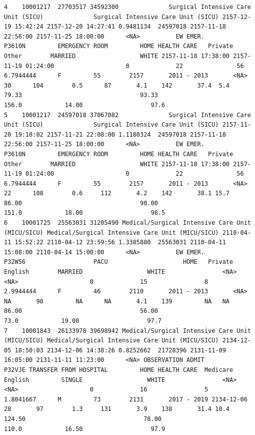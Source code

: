 \documentclass[
]{article}
\begin{document}
\begin{verbatim}
4    10001217  27703517 34592300              Surgical Intensive Care Unit (SICU)              Surgical Intensive Care Unit (SICU) 2157-12-19 15:42:24 2157-12-20 14:27:41 0.9481134  24597018 2157-11-18 22:56:00 2157-11-25 18:00:00      <NA>          EW EMER.            P3610N         EMERGENCY ROOM         HOME HEALTH CARE   Private    Other        MARRIED                  WHITE 2157-11-18 17:38:00 2157-11-19 01:24:00                    0             22               56      6.7944444      F         55        2157       2011 - 2013       <NA>          30      104        0.5      87       4.1    142       37.4  5.4      79.33                                 93.33                                156.0            14.00                   97.6
5    10001217  24597018 37067082              Surgical Intensive Care Unit (SICU)              Surgical Intensive Care Unit (SICU) 2157-11-20 19:18:02 2157-11-21 22:08:00 1.1180324  24597018 2157-11-18 22:56:00 2157-11-25 18:00:00      <NA>          EW EMER.            P3610N         EMERGENCY ROOM         HOME HEALTH CARE   Private    Other        MARRIED                  WHITE 2157-11-18 17:38:00 2157-11-19 01:24:00                    0             22               56      6.7944444      F         55        2157       2011 - 2013       <NA>          22      108        0.6     112       4.2    142       38.1 15.7      86.00                                 90.00                                151.0            18.00                   98.5
6    10001725  25563031 31205490 Medical/Surgical Intensive Care Unit (MICU/SICU) Medical/Surgical Intensive Care Unit (MICU/SICU) 2110-04-11 15:52:22 2110-04-12 23:59:56 1.3385880  25563031 2110-04-11 15:08:00 2110-04-14 15:00:00      <NA>          EW EMER.            P32W56                   PACU                     HOME   Private  English        MARRIED                  WHITE                <NA>                <NA>                    0             15                8      2.9944444      F         46        2110       2011 - 2013       <NA>          NA       98         NA      NA       4.1    139         NA   NA      86.00                                 56.00                                 73.0            19.00                   97.7
7    10001843  26133978 39698942 Medical/Surgical Intensive Care Unit (MICU/SICU) Medical/Surgical Intensive Care Unit (MICU/SICU) 2134-12-05 18:50:03 2134-12-06 14:38:26 0.8252662  21728396 2131-11-09 16:05:00 2131-11-11 11:23:00      <NA> OBSERVATION ADMIT            P32VJE TRANSFER FROM HOSPITAL         HOME HEALTH CARE  Medicare  English         SINGLE                  WHITE                <NA>                <NA>                    0             16                5      1.8041667      M         73        2131       2017 - 2019 2134-12-06          28       97        1.3     131       3.9    138       31.4 10.4     124.50                                 78.00                                110.0            16.50                   97.9

\end{verbatim}
\end{document}
